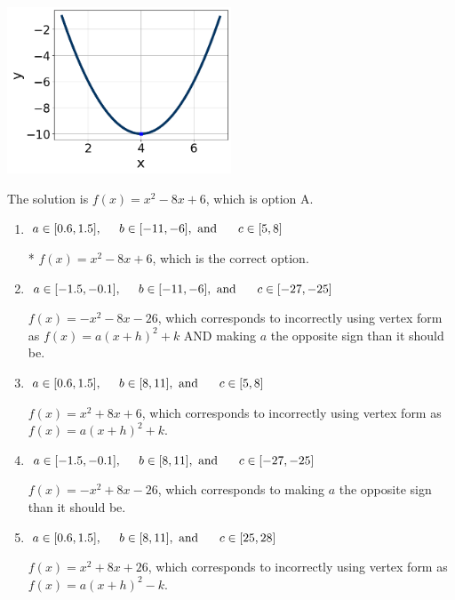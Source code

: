 \documentclass{extbook}[14pt]
\begin{document}
\begin{enumerate}
{\begin{center}
    \includegraphics[width=0.5\textwidth]{../Figures/quadraticGraphToEquationA.png}
\end{center}


The solution is \( f(x) = x^{2} -8 x + 6 \), which is option A.\begin{enumerate}[label=\Alph*.]
\item \( a \in [0.6, 1.5], \hspace*{5mm} b \in [-11, -6], \text{ and } \hspace*{5mm} c \in [5, 8] \)

* $f(x)=x^{2} -8 x + 6$, which is the correct option.
\item \( a \in [-1.5, -0.1], \hspace*{5mm} b \in [-11, -6], \text{ and } \hspace*{5mm} c \in [-27, -25] \)

$f(x)=-x^{2} -8 x -26$, which corresponds to incorrectly using vertex form as $f(x) = a(x+h)^2+k$ AND making $a$ the opposite sign than it should be.
\item \( a \in [0.6, 1.5], \hspace*{5mm} b \in [8, 11], \text{ and } \hspace*{5mm} c \in [5, 8] \)

$f(x)=x^{2} +8 x + 6$, which corresponds to incorrectly using vertex form as $f(x) = a(x+h)^2+k$.
\item \( a \in [-1.5, -0.1], \hspace*{5mm} b \in [8, 11], \text{ and } \hspace*{5mm} c \in [-27, -25] \)

$f(x)=-x^{2} +8 x -26$, which corresponds to making $a$ the opposite sign than it should be.
\item \( a \in [0.6, 1.5], \hspace*{5mm} b \in [8, 11], \text{ and } \hspace*{5mm} c \in [25, 28] \)

$f(x)=x^{2} +8 x + 26$, which corresponds to incorrectly using vertex form as $f(x) = a(x+h)^2 - k$.
\end{enumerate}

}
\end{enumerate}
\end{document}
